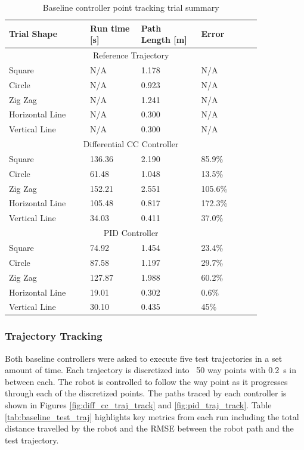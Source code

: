 \begin{table}[h]
    \centering
    \caption{Baseline controller point tracking trial summary}
    \begin{tabular}{p{0.27\linewidth} | p{0.17\linewidth} | p{0.2\linewidth} | p{0.2\linewidth}}
        \textbf{Trial Shape} & \textbf{Run time [s]} & \textbf{Path Length [m]} & \textbf{Error}\\
        \hline
        \multicolumn{4}{c}{Reference Trajectory} \\
        \hline
        Square & N/A & 1.178 & N/A \\
        Circle & N/A & 0.923 & N/A \\
        Zig Zag & N/A & 1.241 & N/A \\
        Horizontal Line & N/A & 0.300 & N/A \\
        Vertical Line & N/A & 0.300 & N/A \\
        \hline
        \multicolumn{4}{c}{Differential CC Controller} \\
        \hline
        Square & 136.36 & 2.190 & 85.9\%\\
        Circle & 61.48 & 1.048 & 13.5\%\\
        Zig Zag & 152.21 & 2.551 & 105.6\%\\
        Horizontal Line & 105.48 & 0.817 & 172.3\%\\
        Vertical Line & 34.03 & 0.411& 37.0\%\\
        \hline
        \multicolumn{4}{c}{PID Controller} \\
        \hline
        Square & 74.92 & 1.454 & 23.4\%\\
        Circle & 87.58 & 1.197 & 29.7\%\\
        Zig Zag & 127.87 & 1.988& 60.2\%\\
        Horizontal Line & 19.01 & 0.302 & 0.6\%\\
        Vertical Line & 30.10 & 0.435 & 45\%\\
        \hline
    \end{tabular}   
    \label{tab:baseline_test_point}
\end{table}


\subsubsection{Trajectory Tracking}
Both baseline controllers were asked to execute five test trajectories in a set amount of time. Each trajectory is discretized into ~50 way points with \SI{0.2}{s} in between each. The robot is controlled to follow the way point as it progresses through each of the discretized points. The paths traced by each controller is shown in Figures \ref{fig:diff_cc_traj_track} and \ref{fig:pid_traj_track}. Table \ref{tab:baseline_test_traj} highlights key metrics from each run including the total distance travelled by the robot and the RMSE between the robot path and the test trajectory. 

